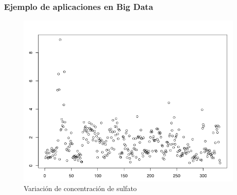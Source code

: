 \documentclass{beamer}
\begin{document}
\begin{frame}
\frametitle{Ejemplo de aplicaciones en Big Data}

\begin{figure}[htb]
\centering
\includegraphics[width=0.50\paperwidth]{sulfate.png}
\caption{Variación de concentración de sulfato}%
\end{figure}

\end{frame}
\end{document}
